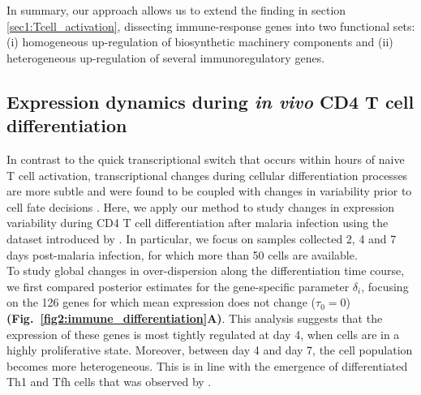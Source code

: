 In summary, our approach allows us to extend the finding in section \ref{sec1:Tcell_activation}, dissecting immune-response genes into two functional sets: (i) homogeneous up-regulation of biosynthetic machinery components and (ii) heterogeneous up-regulation of several immunoregulatory genes.

\subsection{Expression dynamics during \textit{in vivo} CD4\plus{} T cell differentiation}

In contrast to the quick transcriptional switch that occurs within hours of naive T cell activation, transcriptional changes during cellular differentiation processes are more subtle and were found to be coupled with changes in variability prior to cell fate decisions \citep{Richard2016, Mojtahedi2016}. Here, we apply our method to study changes in expression variability during CD4\plus{} T cell differentiation after malaria infection using the dataset introduced by \cite{Lonnberg2017}. In particular, we focus on samples collected 2, 4 and 7 days post-malaria infection, for which more than 50 cells are available.\\

To study global changes in over-dispersion along the differentiation time course, we first compared posterior estimates for the gene-specific parameter $\delta_i$, focusing on the 126 genes for which mean expression does not change ($\tau_0 = 0$) \textbf{(Fig.~\ref{fig2:immune_differentiation}A)}. This analysis suggests that the expression of these genes is most tightly regulated at day 4, when cells are in a highly proliferative state. Moreover, between day 4 and day 7, the cell population becomes more heterogeneous. This is in line with the emergence of differentiated Th1 and Tfh cells that was observed by \cite{Lonnberg2017}. \\

